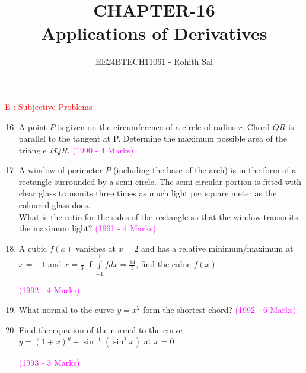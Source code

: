 \documentclass[journal,12pt,twocolumn]{IEEEtran}
\theoremstyle{remark}
\begin{document}

\vspace{3cm}

\title{CHAPTER-16\\Applications of Derivatives}
\author{EE24BTECH11061 - Rohith Sai}
\maketitle
\newpage
\bigskip

\renewcommand{\thefigure}{\theenumi}
\renewcommand{\thetable}{\theenumi}

\begin{flushleft}
\fontsize{18}{20}\selectfont
\textcolor{red}{E : Subjective Problems}
\end{flushleft}

\begin{enumerate}
\setcounter{enumi}{15}
\item A point $P$ is given on the circumference of a circle of radius $r$. Chord $QR$ is parallel to the tangent at P. Determine the maximum possible area of the triangle $PQR.$
\hfill \textcolor{magenta}{(1990 - 4 Marks)}\\

\item A window of perimeter $P$ (including the base of the arch) is in the form of a rectangle surrounded by a semi circle. The semi-circular portion is fitted with clear glass transmits three times as much light per square meter as the coloured glass does.\\What is the ratio for the sides of the rectangle so that the window transmits the maximum light?
\hfill \textcolor{magenta}{(1991 - 4 Marks)}\\

\item A cubic $f(x)$ vanishes at $x=2$ and has a relative minimum/maximum at $x=-1$ and $x=\frac{1}{3}$ if $\int\limits_{-1}^1 f dx = \frac{14}{3}$, find the cubic $f(x)$.
\begin{flushright}
\hfill \textcolor{magenta}{(1992 - 4 Marks)}\\
\end{flushright}

\item What normal to the curve $y=x^2$ form the shortest chord?
\hfill \textcolor{magenta}{(1992 - 6 Marks)}\\

\item Find the equation of the normal to the curve $y=(1+x)^y + \sin^{-1}(\sin^2x)$ at $x=0$
\begin{flushright}
\hfill \textcolor{magenta}{(1993 - 3 Marks)}\\
\end{flushright}


\end{enumerate}
\end{document}
